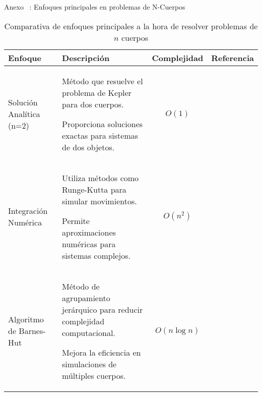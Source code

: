 \begin{frame}{Anexo \thesection~: Enfoques principales en problemas de N-Cuerpos}
    \centering
    \begin{table}[H]
    \centering
    \caption[Enfoques en $n$ cuerpos]{\small Comparativa de enfoques principales a la hora de resolver problemas de $n$ cuerpos}%
    \label{tab:EnfoquesNCuerpos}
    \vspace{-0.2cm}
    \begin{adjustbox}{max width=1.2\textwidth,max height=0.35\textheight, keepaspectratio}
        \begin{tabular}{@{}p{}p{}cc@{}}
            \toprule
            \textbf{Enfoque} & \textbf{Descripción} & \textbf{Complejidad} & \textbf{Referencia} \\
            \midrule
            Solución Analítica (n=2) &
            Método que resuelve el problema de Kepler para dos cuerpos.

            Proporciona soluciones exactas para sistemas de dos objetos. &
            $O(1)$ &~\cite{newton1687} \\
            \midrule
            Integración Numérica &
            Utiliza métodos como Runge-Kutta para simular movimientos.

            Permite aproximaciones numéricas para sistemas complejos. &
            $O(n^2)$ &~\cite{Orlov2017} \\
            \midrule
            Algoritmo de Barnes-Hut &
            Método de agrupamiento jerárquico para reducir complejidad computacional.

            Mejora la eficiencia en simulaciones de múltiples cuerpos. &
            $O(n \log n)$ &~\cite{Barnes1986} \\
            \bottomrule
        \end{tabular}
    \end{adjustbox}
\end{table}
\end{frame}

